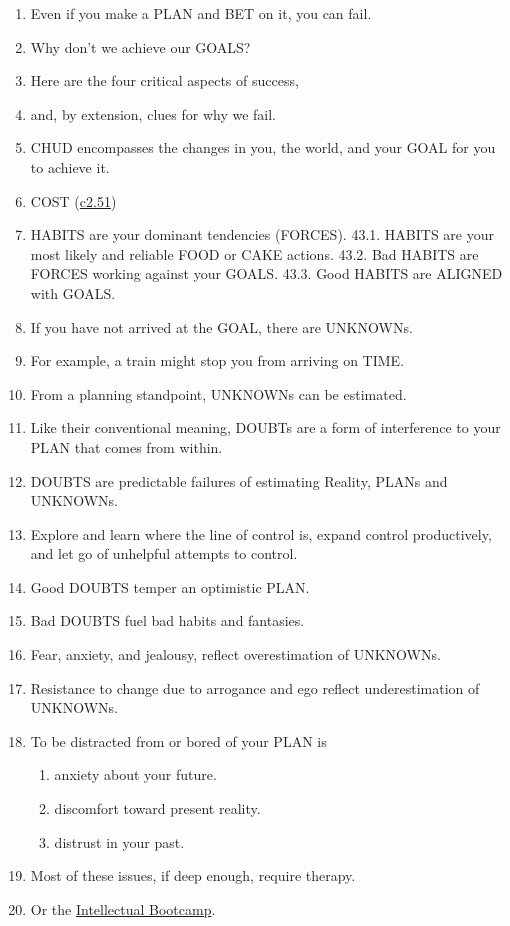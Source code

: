 \documentclass[
]{book}
\providecommand{\tightlist}{%
  \setlength{\itemsep}{0pt}\setlength{\parskip}{0pt}}
\begin{document}
\begin{enumerate}
\def\labelenumi{\arabic{enumi}.}
\setcounter{enumi}{36}
\item
  Even if you make a PLAN and BET on it, you can fail.
\item
  Why don't we achieve our GOALS?
\item
  Here are the four critical aspects of success,
\item
  and, by extension, clues for why we fail.
\item
  CHUD encompasses the changes in you, the world, and your GOAL for
  you to achieve it.
\item
  COST (\protect\hyperlink{self-1}{c2.51})
\item
  HABITS are your dominant tendencies (FORCES).
  43.1. HABITS are your most likely and reliable FOOD or CAKE actions.
  43.2. Bad HABITS are FORCES working against your GOALS.
  43.3. Good HABITS are ALIGNED with GOALS.
\item
  If you have not arrived at the GOAL, there are UNKNOWNs.
\item
  For example, a train might stop you from arriving on TIME.
\item
  From a planning standpoint, UNKNOWNs can be estimated.
\item
  Like their conventional meaning, DOUBTs are a form of interference to your PLAN that comes from within.
\item
  DOUBTS are predictable failures of estimating Reality, PLANs and UNKNOWNs.
\item
  Explore and learn where the line of control is, expand control
  productively, and let go of unhelpful attempts to control.
\item
  Good DOUBTS temper an optimistic PLAN.
\item
  Bad DOUBTS fuel bad habits and fantasies.
\item
  Fear, anxiety, and jealousy, reflect overestimation of UNKNOWNs.
\item
  Resistance to change due to arrogance and ego reflect
  underestimation of UNKNOWNs.
\item
  To be distracted from or bored of your PLAN is

  \begin{enumerate}
  \def\labelenumii{\arabic{enumii}.}
  \tightlist
  \item
    anxiety about your future.
  \item
    discomfort toward present reality.
  \item
    distrust in your past.
  \end{enumerate}
\item
  Most of these issues, if deep enough, require therapy.
\item
  Or the \protect\hyperlink{intellectual-bootcamp}{Intellectual Bootcamp}.
\end{enumerate}
\end{document}
